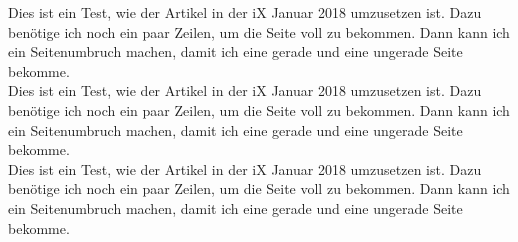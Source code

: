 \documentclass[12pt,twoside,draft=false]{article}
\begin{document}
  Dies ist ein Test, wie der Artikel in der iX Januar 2018 umzusetzen ist. Dazu
  benötige ich noch ein paar Zeilen, um die Seite voll zu bekommen. Dann kann
  ich ein Seitenumbruch machen, damit ich eine gerade und eine ungerade Seite
  bekomme.\\
  \pagebreak
  Dies ist ein Test, wie der Artikel in der iX Januar 2018 umzusetzen ist. Dazu
  benötige ich noch ein paar Zeilen, um die Seite voll zu bekommen. Dann kann
  ich ein Seitenumbruch machen, damit ich eine gerade und eine ungerade Seite
  bekomme.\\
  \pagebreak
  Dies ist ein Test, wie der Artikel in der iX Januar 2018 umzusetzen ist. Dazu
  benötige ich noch ein paar Zeilen, um die Seite voll zu bekommen. Dann kann
  ich ein Seitenumbruch machen, damit ich eine gerade und eine ungerade Seite
  bekomme.\\
\end{document}
